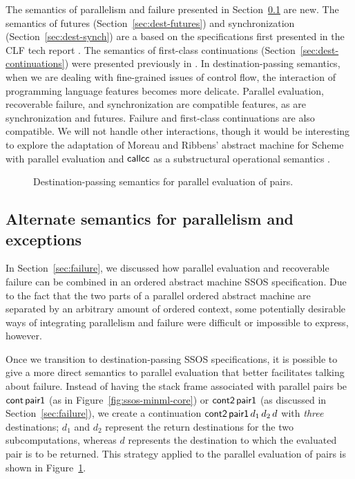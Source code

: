 The semantics of parallelism and failure presented in
Section~\ref{sec:modular-parallelism} are new. The semantics of
futures (Section~\ref{sec:dest-futures}) and synchronization
(Section~\ref{sec:dest-synch}) are a based on the specifications first
presented in the CLF tech report \cite{cervesato02concurrent}. The
semantics of first-class continuations
(Section~\ref{sec:dest-continuations}) were presented previously in
\cite{pfenning04substructural,pfenning09substructural}. In
destination-passing semantics, when we are dealing with fine-grained
issues of control flow, the interaction of programming language
features becomes more delicate.  Parallel evaluation, recoverable
failure, and synchronization are compatible features, as are
synchronization and futures. Failure and first-class continuations are
also compatible. We will not handle other interactions, though it
would be interesting to explore the adaptation of Moreau and Ribbens'
abstract machine for Scheme with parallel evaluation and ${\sf
  callcc}$ as a substructural operational semantics
\cite{moreau96semantics}.

\begin{figure}
\caption{Destination-passing semantics for parallel evaluation of pairs.}
\label{fig:dest-pair}
\end{figure}

\subsection{Alternate semantics for parallelism and exceptions}
\label{sec:modular-parallelism}

In Section~\ref{sec:failure}, we discussed how parallel evaluation and
recoverable failure can be combined in an ordered abstract machine
SSOS specification. Due to the fact that the two parts of a parallel
ordered abstract machine are separated by an arbitrary amount of
ordered context, some potentially desirable ways of
integrating parallelism and failure were difficult or impossible to
express, however. 

Once we transition to destination-passing SSOS specifications, it is
possible to give a more direct semantics to parallel evaluation that
better facilitates talking about failure. Instead of having the stack
frame associated with parallel pairs be ${\sf cont}\,{\sf pair1}$ (as
in Figure~\ref{fig:ssos-minml-core}) or ${\sf cont2}\,{\sf pair1}$ (as
discussed in Section~\ref{sec:failure}), we create a continuation
${\sf cont2}\,{\sf pair1}\,d_1\,d_2\,d$ with {\it three} destinations;
$d_1$ and $d_2$ represent the return destinations for the two
subcomputations, whereas $d$ represents the destination to which the
evaluated pair is to be returned. This strategy applied to the
parallel evaluation of pairs is shown in Figure~\ref{fig:dest-pair}.

